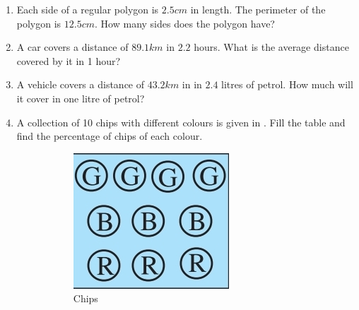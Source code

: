 \begin{enumerate}[label=\thesection.\arabic*,ref=\thesection.\theenumi,resume*]
\item Each side of a regular polygon is $2.5cm$ in length.  The perimeter of the polygon is $12.5cm$.  How many sides does the polygon have?
\item A car covers a distance of $89.1km$ in $2.2$ hours.  What is the average distance covered by it in 1 hour?
\item A vehicle covers a distance of $43.2km$ in in $2.4$ litres of petrol.  How much will it cover in one litre of petrol?
\item 
	A collection of 10 chips with different colours is given in 
.
Fill the table 
and find the percentage of chips of each colour.
\begin{figure}[H]
  \centering
  \begin{subfigure}{0.4\textwidth}
    \includegraphics[width=\textwidth]{figs/percent2.jpg}
    \caption{Chips}
  \end{subfigure}
  \hfill
  \begin{subfigure}{0.4\textwidth}

\end{subfigure}
\end{figure}
\end{enumerate}
